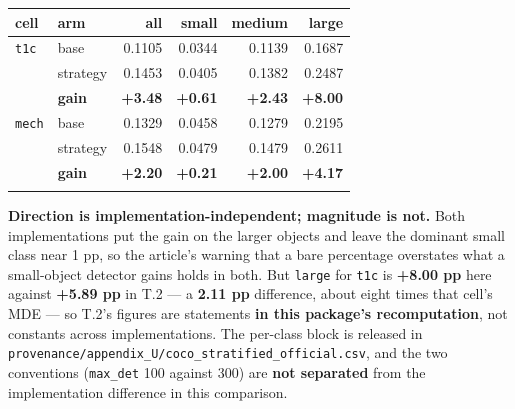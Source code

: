 \documentclass[pdflatex,sn-mathphys-ay]{sn-jnl}
\begin{document}
\begin{center}
{\small
\begin{tabular}{llrrrr}
\toprule
cell & arm & all & small & medium & large \\
\midrule
\texttt{t1c} & base & 0.1105 & 0.0344 & 0.1139 & 0.1687 \\
 & strategy & 0.1453 & 0.0405 & 0.1382 & 0.2487 \\
 & \textbf{gain} & \textbf{+3.48} & \textbf{+0.61} & \textbf{+2.43} & \textbf{+8.00} \\
\texttt{mech} & base & 0.1329 & 0.0458 & 0.1279 & 0.2195 \\
 & strategy & 0.1548 & 0.0479 & 0.1479 & 0.2611 \\
 & \textbf{gain} & \textbf{+2.20} & \textbf{+0.21} & \textbf{+2.00} & \textbf{+4.17} \\
\botrule
\end{tabular}}
\end{center}

\textbf{Direction is implementation-independent; magnitude is not.} Both implementations put the gain on the larger objects and leave the dominant small class near 1 pp, so the article's warning that a bare percentage overstates what a small-object detector gains holds in both. But \texttt{large} for \texttt{t1c} is \textbf{+8.00 pp} here against \textbf{+5.89 pp} in T.2 --- a \textbf{2.11 pp} difference, about eight times that cell's MDE --- so T.2's figures are statements \textbf{in this package's recomputation}, not constants across implementations. The per-class block is released in \texttt{provenance/appendix\_U/coco\_stratified\_official.csv}, and the two conventions (\texttt{max\_det} 100 against 300) are \textbf{not separated} from the implementation difference in this comparison.


\end{document}
